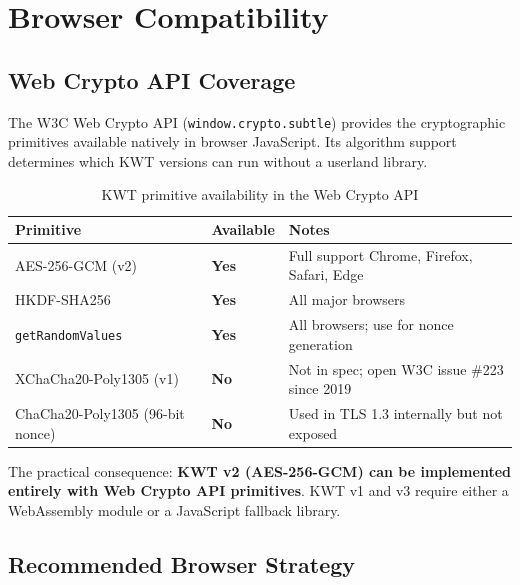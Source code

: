 \documentclass[11pt, letterpaper]{article}
\begin{document}
\section{Browser Compatibility}
\label{sec:browser}

\subsection{Web Crypto API Coverage}

The W3C Web Crypto API (\texttt{window.crypto.subtle}) provides the cryptographic
primitives available natively in browser JavaScript. Its algorithm support
determines which KWT versions can run without a userland library.

\begin{table}[H]
\centering
\caption{KWT primitive availability in the Web Crypto API}
\small
\begin{tabularx}{\linewidth}{L{3.6cm} C{1.8cm} X}
\toprule
{}
\color{white}\textbf{Primitive} &
\color{white}\textbf{Available} &
\color{white}\textbf{Notes} \\
\midrule
AES-256-GCM (v2)        & \textcolor{codegreen}{\textbf{Yes}} & Full support Chrome, Firefox, Safari, Edge \\
HKDF-SHA256             & \textcolor{codegreen}{\textbf{Yes}} & All major browsers \\
\texttt{getRandomValues} & \textcolor{codegreen}{\textbf{Yes}} & All browsers; use for nonce generation \\
XChaCha20-Poly1305 (v1) & \textcolor{codered}{\textbf{No}}  & Not in spec; open W3C issue \#223 since 2019 \\
ChaCha20-Poly1305 (96-bit nonce) & \textcolor{codered}{\textbf{No}} & Used in TLS 1.3 internally but not exposed \\
\bottomrule
\end{tabularx}
\end{table}

The practical consequence: \textbf{KWT v2 (AES-256-GCM) can be implemented
entirely with Web Crypto API primitives}. KWT v1 and v3 require either a
WebAssembly module or a JavaScript fallback library.

\subsection{Recommended Browser Strategy}
\end{document}
